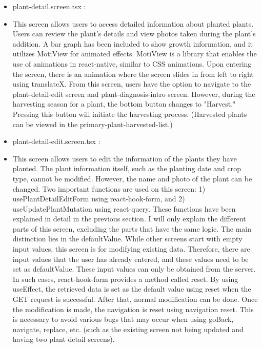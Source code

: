 \documentclass[conference, a4paper]{IEEEtran}
\begin{document}
\begin{enumerate}
\begin{enumerate}
\begin{itemize}
        \item plant-detail.screen.tsx : 
        \item[] This screen allows users to access detailed information about planted plants. Users can review the plant's details and view photos taken during the plant's addition. A bar graph has been included to show growth information, and it utilizes MotiView for animated effects. MotiView is a library that enables the use of animations in react-native, similar to CSS animations. Upon entering the screen, there is an animation where the screen slides in from left to right using translateX. From this screen, users have the option to navigate to the plant-detail-edit screen and plant-diagnosis-intro screen. However, during the harvesting season for a plant, the bottom button changes to "Harvest." Pressing this button will initiate the harvesting process. (Harvested plants can be viewed in the primary-plant-harvested-list.) \\

        \item plant-detail-edit.screen.tsx : 
        \item[] This screen allows users to edit the information of the plants they have planted. The plant information itself, such as the planting date and crop type, cannot be modified. However, the name and photo of the plant can be changed. Two important functions are used on this screen: 1) usePlantDetailEditForm using react-hook-form, and 2) useUpdatePlantMutation using react-query. These functions have been explained in detail in the previous section. I will only explain the different parts of this screen, excluding the parts that have the same logic. The main distinction lies in the defaultValue. While other screens start with empty input values, this screen is for modifying existing data. Therefore, there are input values that the user has already entered, and these values need to be set as defaultValue. These input values can only be obtained from the server. In such cases, react-hook-form provides a method called reset. By using useEffect, the retrieved data is set as the default value using reset when the GET request is successful. After that, normal modification can be done. Once the modification is made, the navigation is reset using navigation reset. This is necessary to avoid various bugs that may occur when using goBack, navigate, replace, etc. (such as the existing screen not being updated and having two plant detail screens). \\


\end{itemize}
\end{enumerate}
\end{enumerate}
\end{document}
